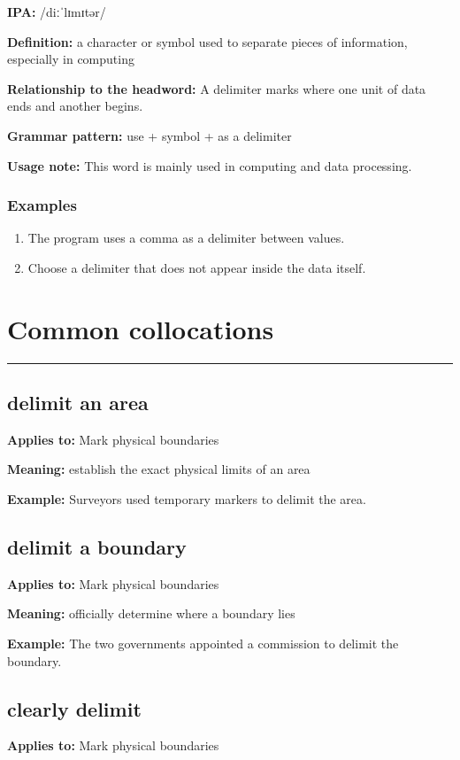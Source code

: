 \documentclass[11pt]{article}
\newcommand{\sectionrule}{\par\vspace{-0.5em}\noindent\textcolor{Accent}{\rule{\linewidth}{0.6pt}}\par}
\begin{document}
\textbf{IPA:} /diːˈlɪmɪtər/

\textbf{Definition:} a character or symbol used to separate pieces of information, especially in computing

\textbf{Relationship to the headword:} A delimiter marks where one unit of data ends and another begins.

\textbf{Grammar pattern:} use + symbol + as a delimiter

\textbf{Usage note:} This word is mainly used in computing and data processing.

\subsubsection{Examples}
\begin{enumerate}
  \item The program uses a comma as a delimiter between values.
  \item Choose a delimiter that does not appear inside the data itself.
\end{enumerate}

\section{Common collocations}
\sectionrule
\subsection{delimit an area}
\textbf{Applies to:} Mark physical boundaries

\textbf{Meaning:} establish the exact physical limits of an area

\textbf{Example:} Surveyors used temporary markers to delimit the area.

\subsection{delimit a boundary}
\textbf{Applies to:} Mark physical boundaries

\textbf{Meaning:} officially determine where a boundary lies

\textbf{Example:} The two governments appointed a commission to delimit the boundary.

\subsection{clearly delimit}
\textbf{Applies to:} Mark physical boundaries
\end{document}
